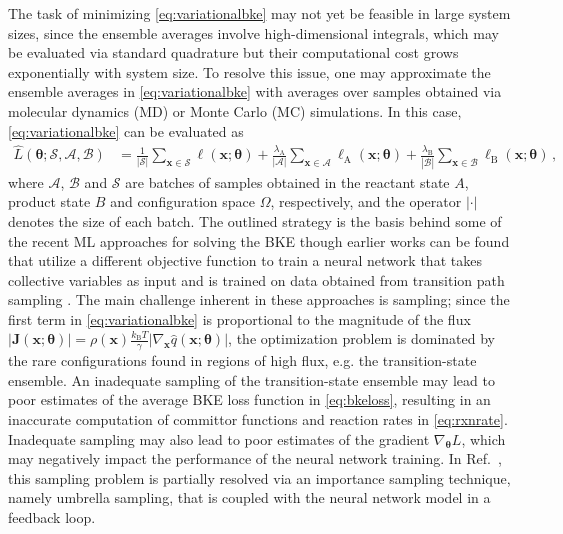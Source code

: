 \documentclass{article}
\numberwithin{equation}{section}
\def\*#1{\mathbf{#1}}
\theoremstyle{definition}
\theoremstyle{remark}
\def\thetab{\boldsymbol{\theta}}
\begin{document}
The task of minimizing \cref{eq:variationalbke} may not yet be feasible in large system sizes, since the ensemble averages involve high-dimensional integrals, which may be evaluated via standard quadrature but their computational cost grows exponentially with system size. 
To resolve this issue, one may approximate the ensemble averages in \cref{eq:variationalbke} with averages over samples obtained via molecular dynamics (MD) or Monte Carlo (MC) simulations. 
In this case, \cref{eq:variationalbke} can be evaluated as 
\begin{align}
    \hat{L}(\thetab; \mathcal{S}, \mathcal{A}, \mathcal{B}) & =  \frac{1}{|\mathcal{S}|} \sum_{\* x \in \mathcal{S}} \ell(\* x; \thetab) +\frac{\lambda_\mathrm{A}}{|\mathcal{A}|} \sum_{\* x \in \mathcal{A}}  \ell_\mathrm{A}(\* x; \thetab) + \frac{\lambda_\mathrm{B}}{|\mathcal{B}|} \sum_{\* x \in \mathcal{B}}  \ell_\mathrm{B}(\* x; \thetab) \,, \label{eq:erm_bke}
 \end{align}
where $\mathcal{A}$, $\mathcal{B}$ and $\mathcal{S}$ are batches of samples obtained in the reactant state $A$, product state $B$ and configuration space $\Omega $, respectively, and the operator $| \cdot |$  denotes the size of each batch. 
The outlined strategy is the basis behind some of the recent ML approaches for solving the BKE \cite{khoo2019solving,li2019computing,rotskoff2020learning,li2021semigroup} though earlier works can be found that utilize a different objective function to train a neural network that takes collective variables as input and is trained on data obtained from transition path sampling \cite{ma2005rc,peters2006likelihood}.
The main challenge inherent in these approaches is sampling; since the first term in \cref{eq:variationalbke} is proportional to the magnitude of the flux $|\*J(\* x; \thetab)| = \rho(\* x) \frac{k_\mathrm{B} T}{\gamma} |\nabla_{\* x} \hat{q}(\* x; \thetab)|$, the optimization problem is dominated by the rare configurations found in regions of high flux, e.g. the transition-state ensemble. 
An inadequate sampling of the transition-state ensemble may lead to poor estimates of the average BKE loss function in \cref{eq:bkeloss}, resulting in an inaccurate computation of committor functions and reaction rates in \cref{eq:rxnrate}. 
Inadequate sampling may also lead to poor estimates of the gradient $ \nabla_{\thetab} L $, which may negatively impact the performance of the neural network training.
In Ref.~\cite{rotskoff2020learning}, this sampling problem is partially resolved via an importance sampling technique, namely umbrella sampling, that is coupled with the neural network model in a feedback loop. 
\end{document}
